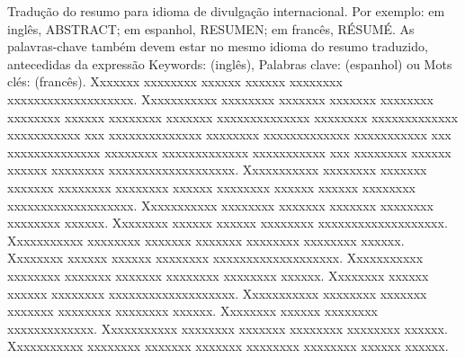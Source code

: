 Tradução do resumo para idioma de divulgação internacional. Por exemplo: em inglês, ABSTRACT; em espanhol, RESUMEN; em francês, RÉSUMÉ. As palavras-chave também devem estar no mesmo idioma do resumo traduzido, antecedidas da expressão Keywords: (inglês), Palabras clave: (espanhol) ou Mots clés: (francês). Xxxxxxx xxxxxxxx xxxxxx xxxxxx xxxxxxxx xxxxxxxxxxxxxxxxxxx. Xxxxxxxxxxx xxxxxxxx xxxxxxx xxxxxxx xxxxxxxx xxxxxxxx xxxxxx xxxxxxxx xxxxxxx xxxxxxxxxxxxxx xxxxxxxx xxxxxxxxxxxxx xxxxxxxxxxx xxx xxxxxxxxxxxxxx  xxxxxxxx xxxxxxxxxxxxx xxxxxxxxxxx xxx xxxxxxxxxxxxxx xxxxxxxx xxxxxxxxxxxxx xxxxxxxxxxx xxx xxxxxxxx xxxxxx xxxxxx xxxxxxxx xxxxxxxxxxxxxxxxxxx. Xxxxxxxxxxx xxxxxxxx xxxxxxx xxxxxxx xxxxxxxx xxxxxxxx xxxxxx xxxxxxxx xxxxxx xxxxxx xxxxxxxx xxxxxxxxxxxxxxxxxxx. 
Xxxxxxxxxxx xxxxxxxx xxxxxxx xxxxxxx xxxxxxxx xxxxxxxx xxxxxx. 
Xxxxxxxx xxxxxx xxxxxx xxxxxxxx xxxxxxxxxxxxxxxxxxx. Xxxxxxxxxxx xxxxxxxx xxxxxxx xxxxxxx xxxxxxxx xxxxxxxx xxxxxx. Xxxxxxxx xxxxxx xxxxxx xxxxxxxx xxxxxxxxxxxxxxxxxxx. Xxxxxxxxxxx xxxxxxxx xxxxxxx xxxxxxx xxxxxxxx xxxxxxxx xxxxxx. Xxxxxxxx xxxxxx xxxxxx xxxxxxxx xxxxxxxxxxxxxxxxxxx. Xxxxxxxxxxx xxxxxxxx xxxxxxx xxxxxxx xxxxxxxx xxxxxxxx xxxxxx. Xxxxxxxx xxxxxx xxxxxxxx xxxxxxxxxxxxx. Xxxxxxxxxxx xxxxxxxx xxxxxxx xxxxxxxx xxxxxxxx xxxxxx. Xxxxxxxxxxx xxxxxxxx xxxxxxx xxxxxxx xxxxxxxx xxxxxxxx xxxxxx xxxxxx.

